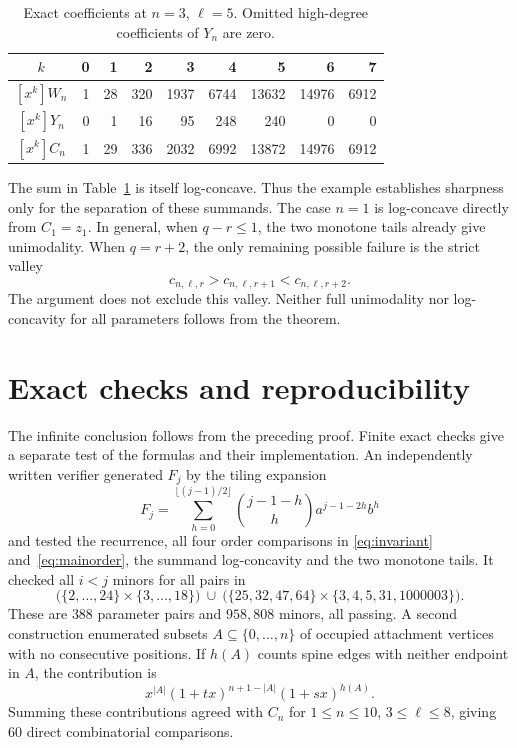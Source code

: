 \documentclass[11pt]{article}
\begin{document}
\begin{table}[htbp]
\centering
\caption{Exact coefficients at $n=3$, $\ell=5$. Omitted high-degree
coefficients of $Y_n$ are zero.}\label{tab:witness}
\small
\begin{tabular}{crrrrrrrr}
\toprule
$k$ & 0 & 1 & 2 & 3 & 4 & 5 & 6 & 7\\
\midrule
$[x^k]W_n$ & 1 & 28 & 320 & 1937 & 6744 & 13632 & 14976 & 6912\\
$[x^k]Y_n$ & 0 & 1 & 16 & 95 & 248 & 240 & 0 & 0\\
$[x^k]C_n$ & 1 & 29 & 336 & 2032 & 6992 & 13872 & 14976 & 6912\\
\bottomrule
\end{tabular}
\end{table}

The sum in Table~\ref{tab:witness} is itself log-concave. Thus the example
establishes sharpness only for the separation of these summands. The case
$n=1$ is log-concave directly from $C_1=z_1$. In general, when $q-r\leq1$,
the two monotone tails already give unimodality. When $q=r+2$, the only
remaining possible failure is the strict valley
\[
 c_{n,\ell,r}>c_{n,\ell,r+1}<c_{n,\ell,r+2}.
\]
The argument does not exclude this valley. Neither full unimodality nor
log-concavity for all parameters follows from the theorem.

\section{Exact checks and reproducibility}

The infinite conclusion follows from the preceding proof. Finite exact
checks give a separate test of the formulas and their implementation.
An independently written verifier generated $F_j$ by the tiling expansion
\[
 F_j=\sum_{h=0}^{\lfloor(j-1)/2\rfloor}
       \binom{j-1-h}{h}a^{j-1-2h}b^h
\]
and tested the recurrence, all four order comparisons in
\eqref{eq:invariant} and~\eqref{eq:mainorder}, the summand
log-concavity and the two monotone tails. It checked all $i<j$ minors
for all pairs in
\[
 \bigl(\{2,\ldots,24\}\times\{3,\ldots,18\}\bigr)
 \ \cup\
 \bigl(\{25,32,47,64\}\times\{3,4,5,31,1000003\}\bigr).
\]
These are $388$ parameter pairs and $958{,}808$ minors, all passing.
A second construction enumerated subsets $A\subseteq\{0,\ldots,n\}$
of occupied attachment vertices with no consecutive positions. If
$h(A)$ counts spine edges with neither endpoint in $A$, the contribution is
\[
 x^{|A|}(1+tx)^{n+1-|A|}(1+sx)^{h(A)}.
\]
Summing these contributions agreed with $C_n$ for $1\leq n\leq10$,
$3\leq\ell\leq8$, giving $60$ direct combinatorial comparisons.
\end{document}
